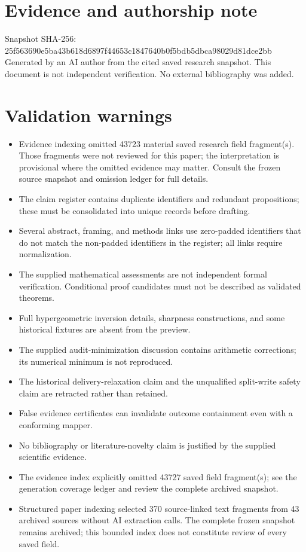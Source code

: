 \documentclass[11pt]{article}
\begin{document}
\section*{Evidence and authorship note}
Snapshot SHA-256: 25f563690e5ba43b618d6897f44653c1847640b0f5bdb5dbca98029d81dce2bb
Generated by an AI author from the cited saved research snapshot. This document is not independent verification. No external bibliography was added.
\section*{Validation warnings}
\begin{itemize}
\item Evidence indexing omitted 43723 material saved research field fragment(s). Those fragments were not reviewed for this paper; the interpretation is provisional where the omitted evidence may matter. Consult the frozen source snapshot and omission ledger for full details.
\item The claim register contains duplicate identifiers and redundant propositions; these must be consolidated into unique records before drafting.
\item Several abstract, framing, and methods links use zero-padded identifiers that do not match the non-padded identifiers in the register; all links require normalization.
\item The supplied mathematical assessments are not independent formal verification. Conditional proof candidates must not be described as validated theorems.
\item Full hypergeometric inversion details, sharpness constructions, and some historical fixtures are absent from the preview.
\item The supplied audit-minimization discussion contains arithmetic corrections; its numerical minimum is not reproduced.
\item The historical delivery-relaxation claim and the unqualified split-write safety claim are retracted rather than retained.
\item False evidence certificates can invalidate outcome containment even with a conforming mapper.
\item No bibliography or literature-novelty claim is justified by the supplied scientific evidence.
\item The evidence index explicitly omitted 43727 saved field fragment(s); see the generation coverage ledger and review the complete archived snapshot.
\item Structured paper indexing selected 370 source-linked text fragments from 43 archived sources without AI extraction calls. The complete frozen snapshot remains archived; this bounded index does not constitute review of every saved field.

\end{itemize}
\end{document}
